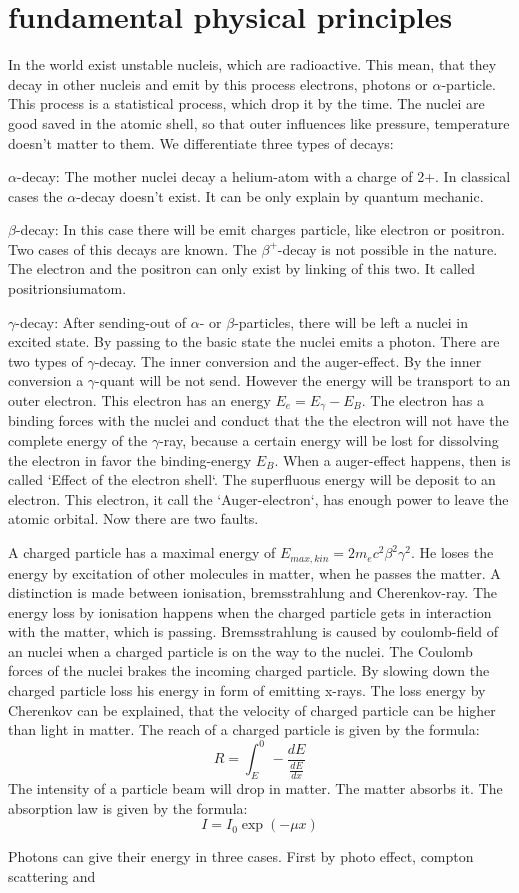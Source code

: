 \documentclass[11pt,a4paper]{article}
\begin{document}
\section{fundamental physical principles}
In the world exist unstable nucleis, which are radioactive. This mean, that they decay in other nucleis and emit by this process electrons, photons or $\alpha$-particle. This process is a statistical process, which drop it by the time. The nuclei are good saved in the atomic shell, so that outer influences like pressure, temperature doesn't matter to them. We differentiate three types of decays:

$\alpha$-decay: The mother nuclei decay a helium-atom with a charge of 2+. In classical cases the $\alpha$-decay doesn't exist. It can be only explain by quantum mechanic. 

$\beta$-decay: In this case there will be emit charges particle, like electron or positron. Two cases of this decays are known. The $\beta^{+}$-decay is not possible in the nature. The electron and the positron can only exist by linking of this two. It called positrionsiumatom. 

$\gamma$-decay: After sending-out of $\alpha$- or $\beta$-particles, there will be left a nuclei in excited state. By passing to the basic state the nuclei emits a photon.
There are two types of $\gamma$-decay. The inner conversion and the auger-effect. By the inner conversion a $\gamma$-quant will be not send. However the energy will be transport to an outer electron. This electron has an energy $E_e=E_{\gamma}-E_B$. The electron has a binding forces with the nuclei and conduct that the the electron will not have the complete energy of the $\gamma$-ray, because a certain energy will be lost for dissolving the electron in favor the binding-energy $E_B$.
When a auger-effect happens, then is called `Effect of the electron shell`. The superfluous energy will be deposit to an electron. This electron, it call the `Auger-electron`, has enough power to leave the atomic orbital. Now there are two faults.

A charged particle has a maximal energy of $E_{max,kin} = 2 m_e c^2 \beta^2 \gamma^2$. He loses the energy by excitation of other molecules in matter, when he passes the matter. A distinction is made between ionisation, bremsstrahlung and Cherenkov-ray. The energy loss by ionisation happens when the charged particle gets in interaction with the matter, which is passing. Bremsstrahlung is caused by coulomb-field of an nuclei when a charged particle is on the way to the nuclei. The Coulomb forces of the nuclei brakes the incoming charged particle. By slowing down the charged particle loss his energy in form of emitting x-rays.  
The loss energy by Cherenkov can be explained, that the velocity of charged particle can be higher than light in matter. 
The reach of a charged particle is given by the formula:
\[R = \int^{0}_{E} - \frac{dE}{\frac{dE}{dx}}\]
The intensity of a particle beam will drop in matter. The matter absorbs it. The absorption law is given by the formula:
\[I = I_0 \exp (-\mu x)\]

Photons can give their energy in three cases. First by photo effect, compton scattering and 
\end{document}
